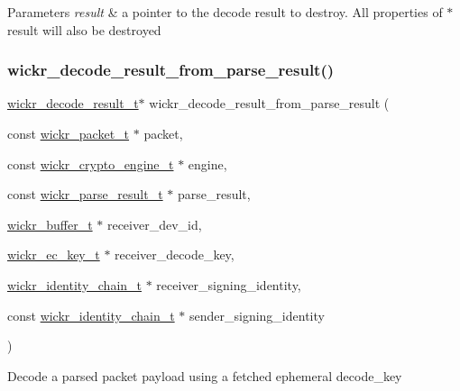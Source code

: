 \begin{DoxyParams}{Parameters}
{\em result} & a pointer to the decode result to destroy. All properties of \textquotesingle{}$\ast$result\textquotesingle{} will also be destroyed \\
\hline
\end{DoxyParams}
\mbox{\label{group__wickr__protocol_ga32d9da2e10d1d653b2ac894d50aaedb0}} 
\subsubsection{\texorpdfstring{wickr\+\_\+decode\+\_\+result\+\_\+from\+\_\+parse\+\_\+result()}{wickr\_decode\_result\_from\_parse\_result()}}
{\footnotesize\ttfamily \hyperlink{structwickr__decode__result}{wickr\+\_\+decode\+\_\+result\+\_\+t}$\ast$ wickr\+\_\+decode\+\_\+result\+\_\+from\+\_\+parse\+\_\+result (\begin{DoxyParamCaption}\item[{const \hyperlink{structwickr__packet}{wickr\+\_\+packet\+\_\+t} $\ast$}]{packet,  }\item[{const \hyperlink{structwickr__crypto__engine}{wickr\+\_\+crypto\+\_\+engine\+\_\+t} $\ast$}]{engine,  }\item[{const \hyperlink{structwickr__parse__result}{wickr\+\_\+parse\+\_\+result\+\_\+t} $\ast$}]{parse\+\_\+result,  }\item[{\hyperlink{structwickr__buffer}{wickr\+\_\+buffer\+\_\+t} $\ast$}]{receiver\+\_\+dev\+\_\+id,  }\item[{\hyperlink{structwickr__ec__key}{wickr\+\_\+ec\+\_\+key\+\_\+t} $\ast$}]{receiver\+\_\+decode\+\_\+key,  }\item[{\hyperlink{structwickr__identity__chain}{wickr\+\_\+identity\+\_\+chain\+\_\+t} $\ast$}]{receiver\+\_\+signing\+\_\+identity,  }\item[{const \hyperlink{structwickr__identity__chain}{wickr\+\_\+identity\+\_\+chain\+\_\+t} $\ast$}]{sender\+\_\+signing\+\_\+identity }\end{DoxyParamCaption})}

Decode a parsed packet payload using a fetched ephemeral decode\+\_\+key

